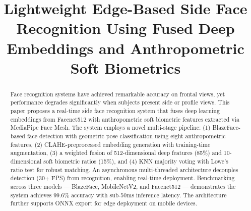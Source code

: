 \documentclass[conference]{IEEEtran}
\begin{document}
\title{Lightweight Edge-Based Side Face Recognition Using Fused Deep Embeddings and Anthropometric Soft Biometrics}

\author{
\and
{}
}

\makeatletter
\let\old@maketitle\@maketitle
\def\@maketitle{%
  \old@maketitle
  \vspace{4pt}%
  \begin{center}%
    \textit{Guide: Dr.\ Usha Patel}\\[2pt]%
    \textit{Dept. of Computer Science and Engineering}\\%
    \textit{Nirma University}\\%
    Ahmedabad, India%
  \end{center}%
  \vspace{4pt}%
}
\makeatother

\maketitle

\begin{abstract}
Face recognition systems have achieved remarkable accuracy on frontal views, yet performance degrades significantly when subjects present side or profile views. This paper proposes a real-time side face recognition system that fuses deep learning embeddings from Facenet512 with anthropometric soft biometric features extracted via MediaPipe Face Mesh. The system employs a novel multi-stage pipeline: (1) BlazeFace-based face detection with geometric pose classification using eight anthropometric features, (2) CLAHE-preprocessed embedding generation with training-time augmentation, (3) a weighted fusion of 512-dimensional deep features (85\%) and 10-dimensional soft biometric ratios (15\%), and (4) KNN majority voting with Lowe's ratio test for robust matching. An asynchronous multi-threaded architecture decouples detection (30+ FPS) from recognition, enabling real-time deployment. Benchmarking across three models --- BlazeFace, MobileNetV2, and Facenet512 --- demonstrates the system achieves 99.6\% accuracy with sub-50ms inference latency. The architecture further supports ONNX export for edge deployment on mobile devices.
\end{abstract}
\end{document}
